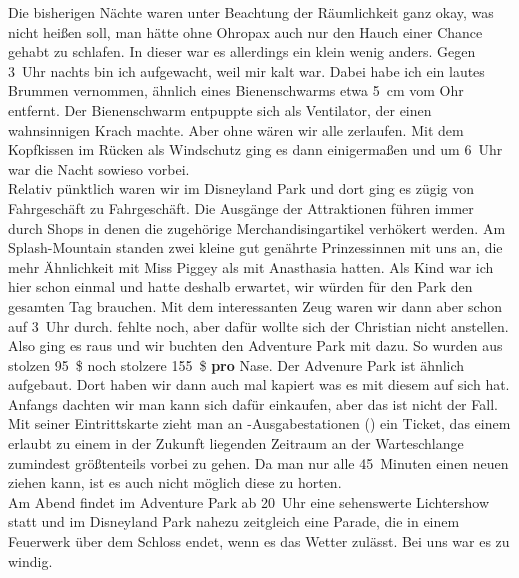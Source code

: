 Die bisherigen Nächte waren unter Beachtung der Räumlichkeit ganz okay, was nicht heißen soll, man hätte ohne Ohropax auch nur den Hauch einer Chance gehabt zu schlafen.
In dieser war es allerdings ein klein wenig anders.
Gegen 3~Uhr nachts bin ich aufgewacht, weil mir kalt war.
Dabei habe ich ein lautes Brummen vernommen, ähnlich eines Bienenschwarms etwa 5~cm vom Ohr entfernt.
Der Bienenschwarm entpuppte sich als Ventilator, der einen wahnsinnigen Krach machte.
Aber ohne wären wir alle zerlaufen.
Mit dem Kopfkissen im Rücken als Windschutz ging es dann einigermaßen und um 6~Uhr war die Nacht sowieso vorbei.\\

Relativ pünktlich waren wir im Disneyland Park und dort ging es zügig von Fahrgeschäft zu Fahrgeschäft.
Die Ausgänge der Attraktionen führen immer durch Shops in denen die zugehörige Merchandisingartikel verhökert werden.
Am Splash-Mountain standen zwei kleine gut genährte Prinzessinnen mit uns an, die mehr Ähnlichkeit mit Miss Piggey als mit Anasthasia hatten. 
Als Kind war ich hier schon einmal und hatte deshalb erwartet, wir würden für den Park den gesamten Tag brauchen.
Mit dem interessanten Zeug waren wir dann aber schon auf 3~Uhr durch.
 fehlte noch, aber dafür wollte sich der Christian nicht anstellen.
Also ging es raus und wir buchten den Adventure Park mit dazu.
So wurden aus stolzen 95~\$ noch stolzere 155~\$ \textbf{pro} Nase.
Der Advenure Park ist ähnlich aufgebaut.
Dort haben wir dann auch mal kapiert was es mit diesem  auf sich hat.
Anfangs dachten wir man kann sich dafür einkaufen, aber das ist nicht der Fall.
Mit seiner Eintrittskarte zieht man an -Ausgabestationen () ein Ticket, das einem erlaubt zu einem in der Zukunft liegenden Zeitraum an der Warteschlange zumindest größtenteils vorbei zu gehen.
Da man nur alle 45~Minuten einen neuen  ziehen kann, ist es auch nicht möglich diese zu horten.\\

Am Abend findet im Adventure Park ab 20~Uhr eine sehenswerte Lichtershow  statt und im Disneyland Park nahezu zeitgleich eine Parade, die in einem Feuerwerk über dem Schloss endet, wenn es das Wetter zulässt.
Bei uns war es zu windig.

